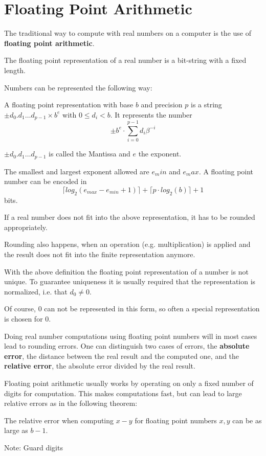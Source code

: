 \section{Floating Point Arithmetic}
The traditional way to compute with real numbers on a computer is the use 
of \textbf{floating point arithmetic}. 

The floating point representation of a real number is a bit-string with a  fixed
length.

Numbers can be represented the following way:
\begin{definition}\label{def: floating point number}
	A floating point representation with base $b$ and precision $p$
	is a string $\pm d_0 . d_1 \dots d_{p-1} \times b^e$ with $0 \leq d_i < b$.	
	It represents the number
	$$ \pm b^e \cdot \sum_{i=0}^{p-1} d_i\beta^{-i} $$ 

	$\pm d_0 . d_1 \dots d_{p-1}$ is called the Mantissa and $e$ the exponent.
	
	The smallest and largest exponent allowed are $e_min$ and $e_max$.
	A floating point number can be encoded in
	$$ \lceil log_2(e_{max}-e_{min}+1) \rceil + \lceil  p \cdot log_2 (b) \rceil + 1 $$
	bits.
\end{definition}
If a real number does not fit into the above representation, it has to be
rounded appropriately.

Rounding also happens, when an operation (e.g. multiplication) is applied and
the result does not fit into the finite representation anymore.

With the above definition the floating point representation of a number is not
unique. 
To guarantee uniqueness it is usually required that the representation  is normalized, i.e. that $d_0 \neq 0$. 

Of course, $0$ can not be represented in this form, so often a special
representation is chosen for $0$.

Doing real number computations using floating point numbers will in most cases
lead to rounding errors.
One can distinguish two cases of errors, the \textbf{absolute error}, the
distance between the real result and the computed one, and the \textbf{relative
error}, the absolute error divided by the real result.

Floating point arithmetic usually works by
operating on
only a fixed number of digits for computation.
This makes computations fast, but can lead to large relative errors as in the following theorem: 
\begin{theorem}
	The relative error when computing $x-y$ for floating point numbers $x,y$ can be as large as $b-1$. 
\end{theorem}
Note: Guard digits
